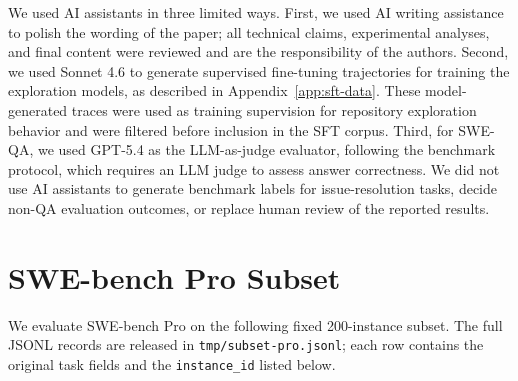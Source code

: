 \documentclass{llmxive}
\begin{document}
We used AI assistants in three limited ways. First, we used AI writing assistance to polish the wording of the paper; all technical claims, experimental analyses, and final content were reviewed and are the responsibility of the authors. Second, we used Sonnet 4.6 to generate supervised fine-tuning trajectories for training the exploration models, as described in Appendix~\ref{app:sft-data}. These model-generated traces were used as training supervision for repository exploration behavior and were filtered before inclusion in the SFT corpus. Third, for SWE-QA, we used GPT-5.4 as the LLM-as-judge evaluator, following the benchmark protocol, which requires an LLM judge to assess answer correctness. We did not use AI assistants to generate benchmark labels for issue-resolution tasks, decide non-QA evaluation outcomes, or replace human review of the reported results.

\section{SWE-bench Pro Subset}
\label{app:swebench-pro-subset}

We evaluate SWE-bench Pro on the following fixed 200-instance subset. The full JSONL records are released in \texttt{tmp/subset-pro.jsonl}; each row contains the original task fields and the \texttt{instance\_id} listed below.

\begingroup
\scriptsize
\end{document}
